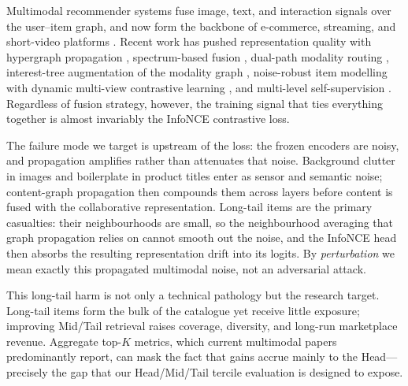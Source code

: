 \documentclass[conference]{IEEEtran}
\begin{document}
Multimodal recommender systems fuse image, text, and interaction
signals over the user--item graph, and now form the backbone of
e-commerce, streaming, and short-video platforms
\cite{guo2025mmhcl,li2026multiview,hao2026itcohd}. Recent work has
pushed representation quality with hypergraph propagation
\cite{guo2025mmhcl,hao2026itcohd}, spectrum-based fusion
\cite{ong2025spectrum,wang2026damps}, dual-path modality routing
\cite{yan2025compensating}, interest-tree augmentation of the modality
graph \cite{meng2025tamer}, noise-robust item modelling with dynamic
multi-view contrastive learning \cite{gong2026noise}, and multi-level
self-supervision \cite{xu2025mentor}. Regardless of fusion strategy,
however, the training signal that ties everything together is almost
invariably the InfoNCE contrastive loss.

The failure mode we target is upstream of the loss: the frozen
encoders are noisy, and propagation amplifies rather than attenuates
that noise. Background clutter in images and boilerplate in product
titles enter as sensor and semantic noise; content-graph
propagation then compounds them across layers before content is
fused with the collaborative representation. Long-tail items are the
primary casualties: their neighbourhoods are small, so the
neighbourhood averaging that graph propagation relies on cannot smooth
out the noise, and the InfoNCE head then absorbs the resulting
representation drift into its logits. By \emph{perturbation} we mean
exactly this propagated multimodal noise, not an adversarial attack.

This long-tail harm is not only a technical pathology but the research
target. Long-tail items form the bulk of the catalogue yet receive
little exposure; improving Mid/Tail retrieval raises coverage,
diversity, and long-run marketplace revenue. Aggregate top-$K$
metrics, which current multimodal papers predominantly report, can
mask the fact that gains accrue mainly to the Head---precisely the
gap that our Head/Mid/Tail tercile evaluation is designed to expose.
\end{document}

